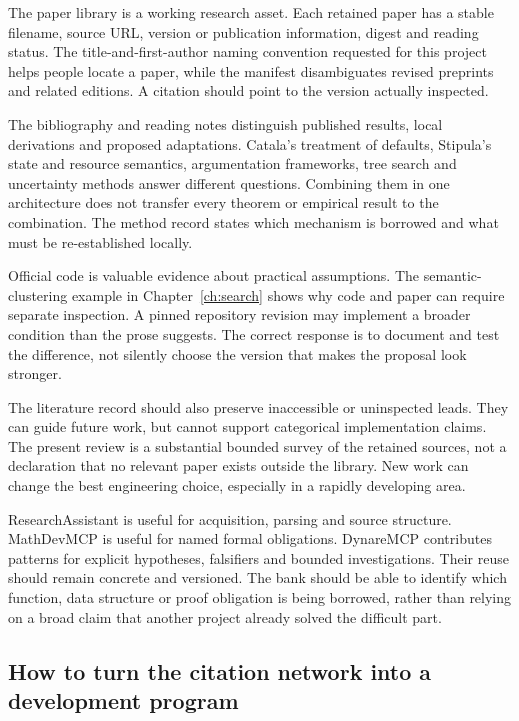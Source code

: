 \documentclass[12pt,a4paper,oneside,openany]{book}
\begin{document}
The paper library is a working research asset. Each retained paper has a stable
filename, source URL, version or publication information, digest and reading
status. The title-and-first-author naming convention requested for this project
helps people locate a paper, while the manifest disambiguates revised preprints
and related editions. A citation should point to the version actually inspected.

The bibliography and reading notes distinguish published results, local
derivations and proposed adaptations. Catala's treatment of defaults, Stipula's
state and resource semantics, argumentation frameworks, tree search and uncertainty
methods answer different questions. Combining them in one architecture does not
transfer every theorem or empirical result to the combination. The method record
states which mechanism is borrowed and what must be re-established locally.

Official code is valuable evidence about practical assumptions. The semantic-
clustering example in Chapter~\ref{ch:search} shows why code and paper can require
separate inspection. A pinned repository revision may implement a broader
condition than the prose suggests. The correct response is to document and test
the difference, not silently choose the version that makes the proposal look
stronger.

The literature record should also preserve inaccessible or uninspected leads.
They can guide future work, but cannot support categorical implementation claims.
The present review is a substantial bounded survey of the retained sources,
not a declaration that no relevant paper exists outside the library. New work can
change the best engineering choice, especially in a rapidly developing area.

ResearchAssistant is useful for acquisition, parsing and source structure.
MathDevMCP is useful for named formal obligations. DynareMCP contributes patterns
for explicit hypotheses, falsifiers and bounded investigations. Their reuse
should remain concrete and versioned. The bank should be able to identify which
function, data structure or proof obligation is being borrowed, rather than
relying on a broad claim that another project already solved the difficult part.

\subsection{How to turn the citation network into a development program}
\label{merge:P-02-literature:09}
\end{document}
